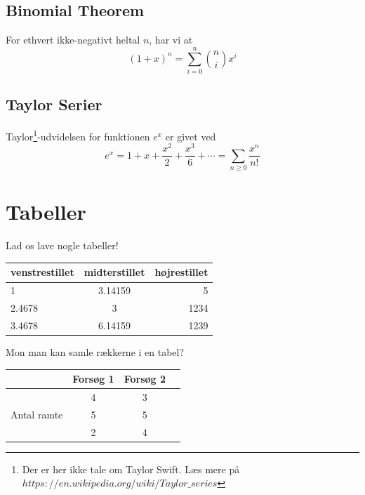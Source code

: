 \documentclass[]{article}
\begin{document}
\subsection{Binomial Theorem}

\begin{Theorem}
For ethvert ikke-negativt heltal $n$, har vi at
\[
	(1+x)^n = \sum_{i=0}^n {n \choose i} x^i
\]
\end{Theorem}

\subsection{Taylor Serier}
Taylor\footnote{Der er her ikke tale om Taylor Swift. Læs mere på $https://en.wikipedia.org/wiki/Taylor\_series$}-udvidelsen for funktionen $e^x$ er givet ved
\[
	e^x = 1 + x + \frac{x^2}{2} + \frac{x^3}{6} + \cdots = \sum_{n\geq 0} \frac{x^n}{n!}
\]

\section{Tabeller}
Lad os lave nogle tabeller!

\begin{center}
	\noindent
	\begin{tabular}{l||c|r}
		venstrestillet & midterstillet & højrestillet \\ \hline
		1 & 3.14159 & 5 \\
		2.4678 & 3 &  1234 \\ \hline \hline
		3.4678 & 6.14159 & 1239
	\end{tabular}
\end{center}


Mon man kan samle rækkerne i en tabel?

\begin{center}
	\noindent
	\begin{tabular}{|c|c|c|c| }
		\hline
		 & Forsøg 1 & Forsøg 2 \\
		\hline
		\multirow{3}{4em}{Antal ramte} & 4 & 3 \\
									   & 5 & 5 \\
									   & 2 & 4 \\
		\hline
	\end{tabular}
\end{center}
\newpage
\end{document}
